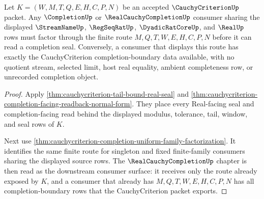 \begin{theorem}
\label{thm:cauchycriterion-tail-budget-real-completion-boundary}
Let $K=(W,M,T,Q,E,H,C,P,N)$ be an accepted $\CauchyCriterionUp$ packet. Any $\CompletionUp$ or $\RealCauchyCompletionUp$ consumer sharing the displayed $\StreamNameUp$, $\RegSeqRatUp$, $\DyadicRatCoreUp$, and $\RealUp$ rows must factor through the finite route $M,Q,T,W,E,H,C,P,N$ before it can read a completion seal. Conversely, a consumer that displays this route has exactly the CauchyCriterion completion-boundary data available, with no quotient stream, selected limit, host real equality, ambient completeness row, or unrecorded completion object.
\end{theorem}
\begin{proof}
Apply \autoref{thm:cauchycriterion-tail-bound-real-seal} and \autoref{thm:cauchycriterion-completion-facing-readback-normal-form}. They place every Real-facing seal and completion-facing read behind the displayed modulus, tolerance, tail, window, and seal rows of $K$.

Next use \autoref{thm:cauchycriterion-completion-uniform-family-factorization}. It identifies the same finite route for singleton and fixed finite-family consumers sharing the displayed source rows. The $\RealCauchyCompletionUp$ chapter is then read as the downstream consumer surface: it receives only the route already exposed by $K$, and a consumer that already has $M,Q,T,W,E,H,C,P,N$ has all completion-boundary rows that the CauchyCriterion packet exports.
\end{proof}

